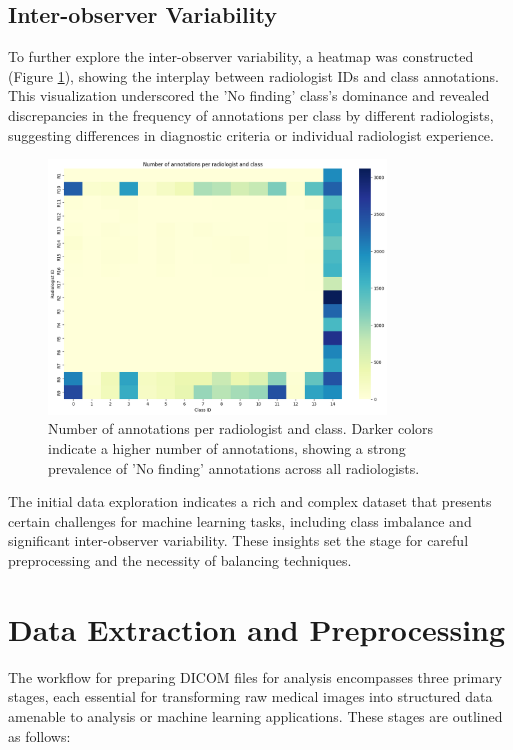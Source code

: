 \documentclass[12pt,oneside]{book} %
\begin{document}
\subsection{Inter-observer Variability}

To further explore the inter-observer variability, a heatmap was constructed
(Figure \ref{fig:annotations_per_rad_class}), showing the interplay between
radiologist IDs and class annotations. This visualization underscored the 'No
finding' class's dominance and revealed discrepancies in the frequency of
annotations per class by different radiologists, suggesting differences in
diagnostic criteria or individual radiologist experience.

\begin{figure}[H]
    \centering
    \includegraphics[width=0.8\textwidth]{../results/annotations_per_rad_class.png}
    \caption{Number of annotations per radiologist and class. Darker colors indicate a higher number of annotations, showing a strong prevalence of 'No finding' annotations across all radiologists.}
    \label{fig:annotations_per_rad_class}
\end{figure}

The initial data exploration indicates a rich and complex dataset that presents
certain challenges for machine learning tasks, including class imbalance and
significant inter-observer variability. These insights set the stage for
careful preprocessing and the necessity of balancing techniques.

\newpage
\section{Data Extraction and Preprocessing}

The workflow for preparing DICOM files for analysis encompasses three primary
stages, each essential for transforming raw medical images into structured data
amenable to analysis or machine learning applications. These stages are
outlined as follows:
\end{document}
